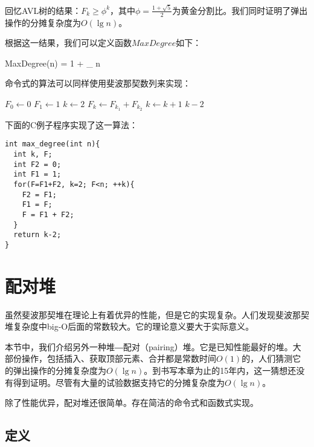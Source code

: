 \documentclass[UTF8]{article}
\begin{document}
回忆AVL树的结果：$F_k \geq \phi^k$，其中$\phi = \frac{1+\sqrt{5}}{2}$为黄金分割比。我们同时证明了弹出操作的分摊复杂度为$O(\lg n)$。

根据这一结果，我们可以定义函数$MaxDegree$如下：

\be
  MaxDegree(n) = 1 + \lfloor \log_{\phi} n \rfloor
\ee

命令式的算法可以同样使用斐波那契数列来实现：

\begin{algorithmic}[1]
  \State $F_0 \gets 0$
  \State $F_1 \gets 1$
  \State $k \gets 2$
  \Repeat
    \State $F_k \gets F_{k_1} + F_{k_2}$
    \State $k \gets k+1$
  \State \Return $k-2$
\EndFunction
\end{algorithmic}

下面的C例子程序实现了这一算法：

\lstset{language=C}
\begin{lstlisting}
int max_degree(int n){
  int k, F;
  int F2 = 0;
  int F1 = 1;
  for(F=F1+F2, k=2; F<n; ++k){
    F2 = F1;
    F1 = F;
    F = F1 + F2;
  }
  return k-2;
}
\end{lstlisting}


\section{配对堆}
\label{pairing-heap} 

虽然斐波那契堆在理论上有着优异的性能，但是它的实现复杂。人们发现斐波那契堆复杂度中big-O后面的常数较大。它的理论意义要大于实际意义。

本节中，我们介绍另外一种堆―配对（pairing）堆。它是已知性能最好的堆。大部份操作，包括插入、获取顶部元素、合并都是常数时间$O(1)$的，人们猜测它的弹出操作的分摊复杂度为$O(\lg n)$\cite{pairing-heap}\cite{okasaki-book}。到书写本章为止的15年内，这一猜想还没有得到证明。尽管有大量的试验数据支持它的分摊复杂度为$O(\lg n)$。

除了性能优异，配对堆还很简单。存在简洁的命令式和函数式实现。

\subsection{定义}
\end{document}
